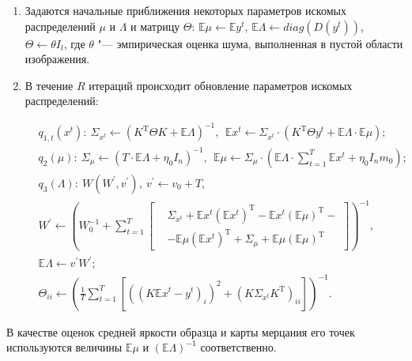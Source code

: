 \begin{enumerate}[beginpenalty=10000]
	\item Задаются начальные приближения некоторых параметров искомых распределений $\mu$ и $\Lambda$ и матрицу $\Theta$: $\mathbb{E}\mu \gets \mathbb{E}y^t$, $\mathbb{E}\Lambda \gets diag\left(D\left( y^t \right)\right)$, $\Theta \gets \theta I_l$, где $\theta$ "--- эмпирическая оценка шума, выполненная в пустой области изображения.
	
	\item В течение $R$ итераций происходит обновление параметров искомых распределений:
	
	\begin{align*}
		&q_{1,t}\left(x^t\right):\ \Sigma_{x^t} \gets \left(K^\mathrm{T} \Theta K+\mathbb{E}\Lambda\right)^{-1},\ \ \mathbb{E}x^t \gets \Sigma_{x^t} \cdot \left(K^\mathrm{T} \Theta y^t+\mathbb{E}\Lambda\cdot\mathbb{E}\mu\right); \\
		&q_2\left(\mu\right):\ \Sigma_\mu \gets \left(T\cdot\mathbb{E}\Lambda+\eta_0 I_n\right)^{-1},\ \ \mathbb{E}\mu \gets \Sigma_\mu \cdot \left(\mathbb{E}\Lambda\cdot\sum_{t=1}^{T}{\mathbb{E}x^t}+\eta_0 I_nm_0\right); \\
		&q_3\left(\Lambda\right):\ W\left(W^\prime,v^\prime\right),\ v^\prime \gets v_0+T, \\
		&W^\prime \gets \left(W_0^{-1}+\sum_{t=1}^{T}\left[
		\begin{aligned}
			&\Sigma_{x^t} + \mathbb{E}x^t\left(\mathbb{E}x^t\right)^\mathrm{T} - \mathbb{E}x^t\left(\mathbb{E}\mu\right)^\mathrm{T} - \\
			&- \mathbb{E}\mu\left(\mathbb{E}x^t\right)^\mathrm{T} + \Sigma_\mu + \mathbb{E}\mu\left(\mathbb{E}\mu\right)^\mathrm{T}
		\end{aligned}
		\right]\right)^{-1}, \\
		&\mathbb{E}\Lambda \gets v^\prime W^\prime; \\
		&\Theta_{ii} \gets \left(\frac{1}{T}\sum_{t=1}^{T}\left[\left(\left(K\mathbb{E}x^t - y^t\right)_i\right)^2 + \left(K\Sigma_{x^t}K^\mathrm{T}\right)_{ii}\right]\right)^{-1}.
	\end{align*}
	
\end{enumerate}

В качестве оценок средней яркости образца и карты мерцания его точек используются величины $\mathbb{E}\mu$ и $\left(\mathbb{E}\Lambda\right)^{-1}$ соответственно.

